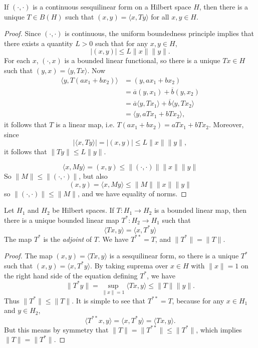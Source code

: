 \begin{lemma}
    If $( \cdot, \cdot )$ is a continuous sesquilinear form on a Hilbert space $H$, then there is a unique $T \in B(H)$ such that $(x,y) = \langle x, Ty \rangle$ for all $x,y \in H$.
\end{lemma}
\begin{proof}
    Since $( \cdot, \cdot)$ is continuous, the uniform boundedness principle implies that there exists a quantity $L > 0$ such that for any $x,y \in H$,
    \[ |(x,y)| \leq L \| x \| \| y \|. \]
    For each $x$, $(\cdot, x)$ is a bounded linear functional, so there is a unique $Tx \in H$ such that $(y,x) = \langle y, Tx \rangle$. Now
    \begin{align*}
        \langle y, T(ax_1 + bx_2) \rangle &= (y, ax_1 + bx_2)\\
        &= \overline{a} (y,x_1) + \overline{b} (y,x_2)\\
        &= \overline{a} \langle y, Tx_1 \rangle + \overline{b} \langle y, Tx_2 \rangle\\
        &= \langle y, a Tx_1 + b Tx_2 \rangle,
    \end{align*}
    it follows that $T$ is a linear map, i.e. $T(ax_1 + bx_2) = aTx_1 + b T x_2$. Moreover, since
    \[ |\langle x, Ty \rangle| = |(x,y)| \leq L \| x \| \| y \|, \]
    it follows that $\| Ty \| \leq L \| y \|$.

    \[ \langle x, My \rangle = (x,y) \leq \|(\cdot, \cdot)\| \| x \| \| y \| \]
    So $\| M \| \leq \|(\cdot,\cdot)\|$, but also
    \[ (x,y) = \langle x, My \rangle \leq \| M \| \| x \| \| y \| \]
    so $\|(\cdot, \cdot)\| \leq \| M \|$, and we have equality of norms.
\end{proof}

\begin{theorem}
    Let $H_1$ and $H_2$ be Hilbert spaces. If $T: H_1 \to H_2$ is a bounded linear map, then there is a unique bounded linear map $T^*: H_2 \to H_1$ such that
    \[ \langle Tx, y \rangle = \langle x, T^*y \rangle \]
    The map $T^*$ is the \emph{adjoint} of $T$. We have $T^{**} = T$, and $\| T^* \| = \| T \|$.
\end{theorem}
\begin{proof}
    The map $(x,y) = \langle Tx, y \rangle$ is a sesquilinear form, so there is a unique $T^*$ such that $(x,y) = \langle x, T^*y \rangle$. By taking suprema over $x \in H$ with $\| x \| = 1$ on the right hand side of the equation defining $T^*$, we have
    \[ \| T^* y \| = \sup_{\| x \| = 1} \langle Tx, y \rangle \leq \| T \| \| y \|. \]
    Thus $\| T^* \| \leq \| T \|$. It is simple to see that $T^{**} = T$, because for any $x \in H_1$ and $y \in H_2$,
    \[ \langle T^{**} x, y \rangle = \langle x, T^* y \rangle = \langle Tx, y \rangle. \]
    But this means by symmetry that $\| T \| = \| T^{**} \| \leq \| T^* \|$, which implies $\| T \| = \| T^* \|$.
\end{proof}

